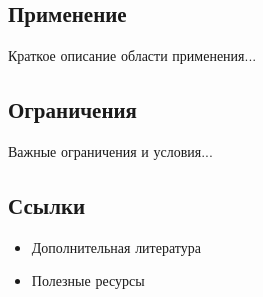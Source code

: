 \documentclass[10pt,landscape,a4paper]{article}
\begin{document}
\begin{multicols}{2}
\subsection{Применение}
Краткое описание области применения...

\subsection{Ограничения}
Важные ограничения и условия...

\subsection{Ссылки}
\begin{itemize}
    \item Дополнительная литература
    \item Полезные ресурсы
\end{itemize}

\end{multicols}
\end{document}
